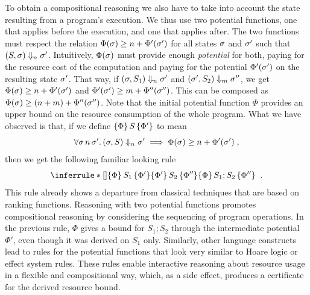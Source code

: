 \documentclass[nocopyrightspace,preprint,pldi]{sigplanconf-pldi15}
\begin{document}
To obtain a compositional reasoning we also have to take into account the
state resulting from a program's execution.  We thus use two potential
functions, one that applies before the execution, and one that applies
after.  The two functions must respect the relation $\Phi(\sigma)
\ge n + \Phi'(\sigma')$ for all states $\sigma$ and $\sigma'$ such
that $(S, \sigma) \Downarrow_n \sigma'$.  Intuitively, $\Phi(\sigma)$
must provide enough \emph{potential} for both, paying for the resource
cost of the computation and paying for the potential $\Phi'(\sigma')$ on
the resulting state $\sigma'$. That way, if $(\sigma, S_1) \Downarrow_n
\sigma'$ and $(\sigma', S_2) \Downarrow_m \sigma''$, we get $\Phi(\sigma)
\ge n + \Phi'(\sigma')$ and $\Phi'(\sigma') \ge m + \Phi''(\sigma'')$.
This can be composed as $\Phi(\sigma) \ge (n + m) + \Phi''(\sigma'')$.
Note that the initial potential function $\Phi$ provides an upper bound
on the resource consumption of the whole program.  What we have observed
is that, if we define $\{\Phi\}\, S\, \{\Phi'\}$ to mean
$$
\forall \sigma\, n\, \sigma'.\, (\sigma, S) \Downarrow_n \sigma' \implies \Phi(\sigma) \ge
n + \Phi'(\sigma') \; ,
$$
then we get the following familiar looking rule
$$
\RuleNolabel
{\htriple{\Phi}{S_1}{\Phi'} \\ \htriple{\Phi'}{S_2}{\Phi''}}
{\htriple{\Phi} {S_1; S_2}  {\Phi''}} \;\; .
$$
%
This rule already shows a departure from classical techniques that are
based on ranking functions.  Reasoning with two potential functions
promotes compositional reasoning by considering the sequencing of
program operations.  In the previous rule, $\Phi$ gives a bound for
$S_1; S_2$ through the intermediate potential $\Phi'$, even though it
was derived on $S_1$ only.
%
Similarly, other language constructs lead to rules for the potential
functions that look very similar to Hoare logic or effect system
rules.  These rules enable interactive reasoning about resource usage
in a flexible and compositional way, which, as a side effect, produces
a certificate for the derived resource bound.



\end{document}
